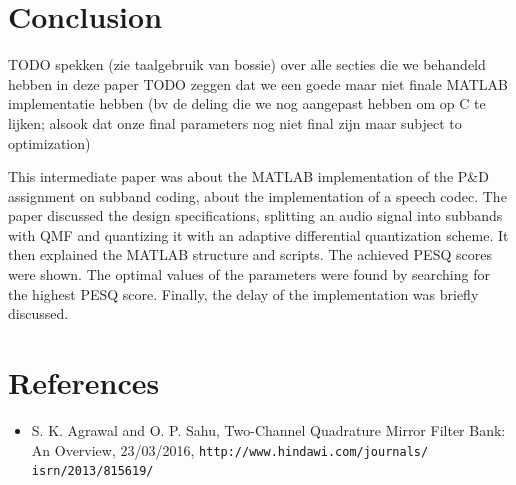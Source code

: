 \documentclass[a4paper]{article}
\begin{document}
\section{Conclusion}
TODO spekken (zie taalgebruik van bossie) over alle secties die we behandeld hebben in deze paper
TODO zeggen dat we een goede maar niet finale MATLAB implementatie hebben (bv de deling die we nog aangepast hebben om op C te lijken; alsook dat onze final parameters nog niet final zijn maar subject to optimization)

This intermediate paper was about the MATLAB implementation of the P\&D assignment on subband coding, about the implementation of a speech codec. The paper discussed the design specifications, splitting an audio signal into subbands with QMF and quantizing it with an adaptive differential quantization scheme. It then explained the MATLAB structure and scripts. The achieved PESQ scores were shown. The optimal values of the parameters were found by searching for the highest PESQ score. Finally, the delay of the implementation was briefly discussed.

\section{References}
\begin{itemize}
\item S. K. Agrawal and O. P. Sahu, Two-Channel Quadrature Mirror Filter Bank: An Overview, 23/03/2016,
\texttt{http://www.hindawi.com/journals/ isrn/2013/815619/}
\end{itemize}
\end{document}
